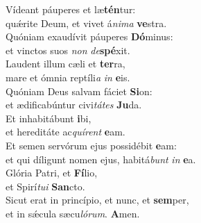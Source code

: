 \oddverse Vídeant páuperes et læ\textbf{tén}tur:~\*\\
\oddverse quǽrite Deum, et vivet á\textit{ni}\textit{ma} \textbf{ve}stra.\\
\evenverse Quóniam exaudívit páuperes \textbf{Dó}minus:~\*\\
\evenverse et vinctos suos \textit{non} \textit{de}\textbf{spé}xit.\\
\oddverse Laudent illum cæli et \textbf{ter}ra,~\*\\
\oddverse mare et ómnia reptíli\textit{a} \textit{in} \textbf{e}is.\\
\evenverse Quóniam Deus salvam fáciet \textbf{Si}on:~\*\\
\evenverse et ædificabúntur civi\textit{tá}\textit{tes} \textbf{Ju}da.\\
\oddverse Et inhabitábunt \textbf{i}bi,~\*\\
\oddverse et hereditáte ac\textit{quí}\textit{rent} \textbf{e}am.\\
\evenverse Et semen servórum ejus possidébit \textbf{e}am:~\*\\
\evenverse et qui díligunt nomen ejus, habitá\textit{bunt} \textit{in} \textbf{e}a.\\
\oddverse Glória Patri, et \textbf{Fí}lio,~\*\\
\oddverse et Spirí\textit{tu}\textit{i} \textbf{San}cto.\\
\evenverse Sicut erat in princípio, et nunc, et \textbf{sem}per,~\*\\
\evenverse et in sǽcula sæcu\textit{ló}\textit{rum}. \textbf{A}men.\\
